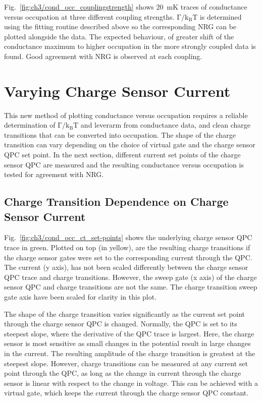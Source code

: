 Fig.~\ref{fig:ch3/cond_occ_couplingstrength} shows \qty{20}{mK} traces of conductance versus occupation at three different coupling strengths. $\mathrm{\Gamma/k_BT}$ is determined using the fitting routine described above so the corresponding NRG can be plotted alongside the data. The expected behaviour, of greater shift of the conductance maximum to higher occupation in the more strongly coupled data is found. Good agreement with NRG is observed at each coupling.







\section{Varying Charge Sensor Current}

This new method of plotting conductance versus occupation requires a reliable determination of $\mathrm{\Gamma/k_BT}$ and leverarm from conductance data, and clean charge transitions that can be converted into occupation. The shape of the charge transition can vary depending on the choice of virtual gate and the charge sensor QPC set point. In the next section, different current set points of the charge sensor QPC are measured and the resulting conductance versus occupation is tested for agreement with NRG.

\subsection{Charge Transition Dependence on Charge Sensor Current}

Fig.~\ref{fig:ch3/cond_occ_ct_set-points} shows the underlying charge sensor QPC trace in green. Plotted on top (in yellow), are the resulting charge transitions if the charge sensor gates were set to the corresponding current through the QPC. The current (y axis), has not been scaled differently between the charge sensor QPC trace and charge transitions. However, the sweep gate (x axis) of the charge sensor QPC and charge transitions are not the same. The charge transition sweep gate axis have been scaled for clarity in this plot. 



The shape of the charge transition varies significantly as the current set point through the charge sensor QPC is changed. Normally, the QPC is set to its steepest slope, where the derivative of the QPC trace is largest. Here, the charge sensor is most sensitive as small changes in the potential result in large changes in the current. The resulting amplitude of the charge transition is greatest at the steepest slope. However, charge transitions can be measured at any current set point through the QPC, as long as the change in current through the charge sensor is linear with respect to the change in voltage. This can be achieved with a virtual gate, which keeps the current through the charge sensor QPC constant. 

